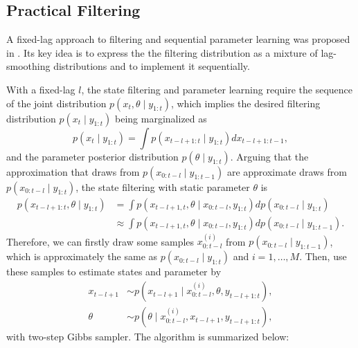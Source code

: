 \subsection{Practical Filtering}

A fixed-lag approach to filtering and sequential parameter learning was proposed in \cite{polson2008practical}. Its key idea is to express the the filtering distribution as a mixture of lag-smoothing distributions and to implement it sequentially. 

With a fixed-lag $l$, the state filtering and parameter learning require the sequence of the joint distribution $p(x_t,\theta\mid y_{1:t})$, which implies the desired filtering distribution $p(x_t\mid y_{1:t})$ being marginalized as 
\begin{equation*}
p(x_t\mid y_{1:t}) = \int p(x_{t-l+1:t}\mid y_{1:t}) dx_{t-l+1:t-1},
\end{equation*}
and the parameter posterior distribution $p(\theta\mid y_{1:t})$. Arguing that the approximation that draws from $p(x_{0:t-l}\mid y_{1:t-1})$ are approximate draws from $p(x_{0:t-l}\mid y_{1:t})$, the state filtering with static parameter $\theta$ is 
\begin{align*}
p(x_{t-l+1:t},\theta\mid y_{1:t}) &=\int p(x_{t-l+1,t},\theta \mid x_{0:t-l},y_{1:t}) dp(x_{0:t-l}\mid y_{1:t}) \\
&\approx \int p(x_{t-l+1,t},\theta \mid x_{0:t-l},y_{1:t}) dp(x_{0:t-l}\mid y_{1:t-1}).
\end{align*}
Therefore, we can firstly draw some samples $x_{0:t-l}^{(i)}$ from $p(x_{0:t-l}\mid y_{1:t-1})$, which is approximately the same as $p(x_{0:t-l}\mid y_{1:t})$ and $i=1,\dots,M$. Then, use these samples to estimate states and parameter by 
\begin{align*}
x_{t-l+1} &\sim p(x_{t-l+1}\mid x_{0:t-l}^{(i)},\theta,y_{t-l+1:t}),\\
\theta &\sim p(\theta \mid x_{0:t-l}^{(i)},x_{t-l+1},y_{t-l+1:t}),
\end{align*}
with two-step Gibbs sampler. The algorithm is summarized below:

